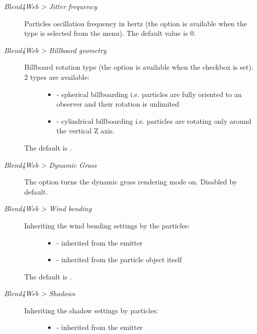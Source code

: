 \documentclass[a4paper,12pt,oneside]{sphinxmanual}
\begin{document}
\begin{description}
\item[{\emph{Blend4Web \textgreater{} Jitter frequency}}] \leavevmode
Particles oscillation frequency in hertz (the option is available when the  type is selected from the  menu). The default value is 0.

\item[{\emph{Blend4Web \textgreater{} Billboard geometry}}] \leavevmode\begin{description}
\item[{Billboard rotation type (the option is available when the  checkbox is set). 2 types are available:}] \leavevmode\begin{itemize}
\item {} 
 - spherical billboarding i.e. particles are fully oriented to an observer and their rotation is unlimited

\item {} 
 - cylindrical billboarding i.e. particles are rotating only around the vertical Z axis.

\end{itemize}

\end{description}

The default is .

\item[{\emph{Blend4Web \textgreater{} Dynamic Grass}}] \leavevmode
The option turns the dynamic grass rendering mode on. Disabled by default.

\item[{\emph{Blend4Web \textgreater{} Wind bending}}] \leavevmode\begin{description}
\item[{Inheriting the wind bending settings by the particles:}] \leavevmode\begin{itemize}
\item {} 
 - inherited from the emitter

\item {} 
 - inherited from the particle object itself

\end{itemize}

\end{description}

The default is .

\item[{\emph{Blend4Web \textgreater{} Shadows}}] \leavevmode\begin{description}
\item[{Inheriting the shadow settings by particles:}] \leavevmode\begin{itemize}
\item {} 
 - inherited from the emitter


\end{itemize}
\end{description}
\end{description}
\end{document}
